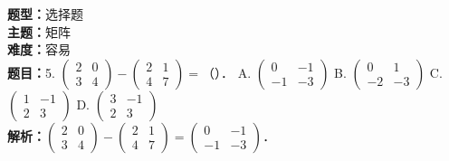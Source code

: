 \documentclass{ctexart}
\newenvironment{question}[5]{%
	\noindent\textbf{题型：}#1\\
	\textbf{主题：}#2\\
	\textbf{难度：}#3\\
	\textbf{题目：}#4\\
	\textbf{解析：}#5\\
	\vspace{1em}
}{}
\begin{document}
	\begin{question}
		{选择题}
		{矩阵}
		{容易}
		{5. \(\left(\begin{array}{ll}2 & 0 \\ 3 & 4\end{array}\right)-\left(\begin{array}{ll}2 & 1 \\ 4 & 7\end{array}\right)=\)（）．
			A. \(\left(\begin{array}{cc}0 & -1 \\ -1 & -3\end{array}\right)\)
			B. \(\left(\begin{array}{cc}0 & 1 \\ -2 & -3\end{array}\right)\)
			C. \(\left(\begin{array}{cc}1 & -1 \\ 2 & 3\end{array}\right)\)
			D. \(\left(\begin{array}{cc}3 & -1 \\ 2 & 3\end{array}\right)\)}
		{\(\left(\begin{array}{ll}2 & 0 \\ 3 & 4\end{array}\right)-\left(\begin{array}{ll}2 & 1 \\ 4 & 7\end{array}\right)=\left(\begin{array}{cc}0 & -1 \\ -1 & -3\end{array}\right)\)．}
	\end{question}
	
\end{document}
